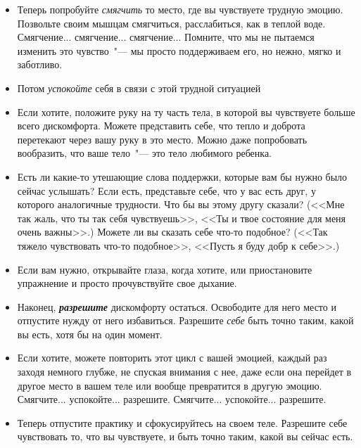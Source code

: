 \begin{itemize}
	\item Теперь попробуйте \emph{смягчить} то место, где вы чувствуете трудную эмоцию. Позвольте своим мышцам смягчиться, расслабиться, как в теплой воде. Смягчение... смягчение... смягчение... Помните, что мы не пытаемся изменить это чувство~"--- мы просто поддерживаем его, но нежно, мягко и заботливо.
	
	\item Потом \emph{успокойте} себя в связи с этой трудной ситуацией
	
	\item Если хотите, положите руку на ту часть тела, в которой вы чувствуете больше всего дискомфорта. Можете представить себе, что тепло и доброта перетекают через вашу руку в это место. Можно даже попробовать вообразить, что ваше тело~"--- это тело любимого ребенка.
	
	\item Есть ли какие-то утешающие слова поддержки, которые вам бы нужно было сейчас услышать? Если есть, представьте себе, что у вас есть друг, у которого аналогичные трудности. Что бы вы этому другу сказали? (<<Мне так жаль, что ты так себя чувствуешь>>, <<Ты и твое состояние для меня очень важны>>.) Можете ли вы сказать себе что-то подобное? (<<Так тяжело чувствовать что-то подобное>>, <<Пусть я буду добр к себе>>.)
	
	\item Если вам нужно, открывайте глаза, когда хотите, или приостановите упражнение и просто прочувствуйте свое дыхание.
	
	\item Наконец, \emph{\textbf{разрешите}} дискомфорту остаться. Освободите для него место и отпустите нужду от него избавиться. Разрешите \emph{себе} быть точно таким, какой вы есть, хотя бы на один момент.
	
	\item Если хотите, можете повторить этот цикл с вашей эмоцией, каждый раз заходя немного глубже, не спуская внимания с нее, даже если она перейдет в другое место в вашем теле или вообще превратится в другую эмоцию. Смягчите... успокойте... разрешите. Смягчите... успокойте... разрешите. 
	
	\item Теперь отпустите практику и сфокусируйтесь на своем теле. Разрешите себе чувствовать то, что вы чувствуете, и быть точно таким, какой вы сейчас есть.
\end{itemize}

